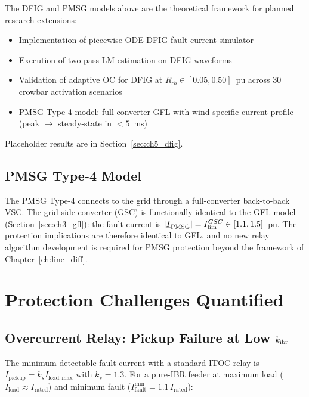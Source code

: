 \begin{tcolorbox}[colback=orange!5,colframe=orange!60!black,
  fonttitle=\bfseries\small,
  title={Section~\ref{sec:ch3_dfig} (Pending: 18--24 month timeline)},
  breakable]
\small
The DFIG and PMSG models above are the theoretical framework for planned
research extensions:
\begin{itemize}
\item Implementation of piecewise-ODE DFIG fault current simulator
\item Execution of two-pass LM estimation on DFIG waveforms
\item Validation of adaptive OC for DFIG at $R_{cb} \in [0.05, 0.50]$~pu
      across 30 crowbar activation scenarios
\item PMSG Type-4 model: full-converter GFL with wind-specific current
      profile (peak $\to$ steady-state in $<5$~ms)
\end{itemize}
Placeholder results are in Section~\ref{sec:ch5_dfig}.
\end{tcolorbox}

\subsection{PMSG Type-4 Model}

The PMSG Type-4 connects to the grid through a full-converter back-to-back
VSC. The grid-side converter (GSC) is functionally identical to the GFL
model (Section~\ref{sec:ch3_gfl}): the fault current is
$|\underline{I}_\mathrm{PMSG}| = I_\mathrm{lim}^{GSC} \in [1.1, 1.5]$~pu.
The protection implications are therefore identical to GFL, and no new
relay algorithm development is required for PMSG protection beyond the
framework of Chapter~\ref{ch:line_diff}.

\section{Protection Challenges Quantified}
\label{sec:ch3_challenges}

\subsection{Overcurrent Relay: Pickup Failure at Low $k_\mathrm{ibr}$}

The minimum detectable fault current with a standard ITOC relay is
$I_\mathrm{pickup} = k_s I_\mathrm{load,max}$ with $k_s = 1.3$.
For a pure-IBR feeder at maximum load ($I_\mathrm{load} \approx I_\mathrm{rated}$)
and minimum fault ($I_\mathrm{fault}^\mathrm{min} = 1.1\,I_\mathrm{rated}$):


